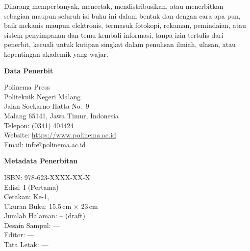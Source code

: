 \begin{titlepage}
\begin{tcolorbox}[
    enhanced,
    width=\linewidth,
    colback=white,
    colframe=black!45,
    boxrule=0.5pt,
    arc=1.5pt,
    left=8pt,
    right=8pt,
    top=8pt,
    bottom=8pt
]
\vspace{0.35cm}

Dilarang memperbanyak, mencetak, mendistribusikan, atau menerbitkan sebagian maupun seluruh isi buku ini dalam bentuk dan dengan cara apa pun, baik mekanis maupun elektronis, termasuk fotokopi, rekaman, pemindaian, atau sistem penyimpanan dan temu kembali informasi, tanpa izin tertulis dari penerbit, kecuali untuk kutipan singkat dalam penulisan ilmiah, ulasan, atau kepentingan akademik yang wajar.
\end{tcolorbox}

\vspace{0.45cm}

\begin{minipage}[t]{0.48\textwidth}
\begin{tcolorbox}[
    enhanced,
    width=\linewidth,
    colback=black!2,
    colframe=black!45,
    boxrule=0.5pt,
    arc=1.5pt,
    left=8pt,
    right=8pt,
    top=8pt,
    bottom=8pt,
    height=6.25cm
]
{\bfseries\sffamily Data Penerbit}\par
\vspace{0.25cm}
Polinema Press\\
Politeknik Negeri Malang\\
Jalan Soekarno-Hatta No.~9\\
Malang 65141, Jawa Timur, Indonesia\\[0.2cm]
Telepon: (0341) 404424\\
Website: \url{https://www.polinema.ac.id}\\
Email: info@polinema.ac.id
\end{tcolorbox}
\end{minipage}
\hfill
\begin{minipage}[t]{0.48\textwidth}
\begin{tcolorbox}[
    enhanced,
    width=\linewidth,
    colback=black!2,
    colframe=black!45,
    boxrule=0.5pt,
    arc=1.5pt,
    left=8pt,
    right=8pt,
    top=8pt,
    bottom=8pt,
    height=6.25cm
]
{\bfseries\sffamily Metadata Penerbitan}\par
\vspace{0.25cm}
ISBN: 978-623-XXXX-XX-X\\
Edisi: I (Pertama)\\
Cetakan: Ke-1, \the\year\\
Ukuran Buku: 15{,}5\,cm $\times$ 23\,cm\\
Jumlah Halaman: -- (draft)\\
Desain Sampul: ---\\
Editor: ---\\
Tata Letak: ---
\end{tcolorbox}
\end{minipage}


\end{titlepage}
